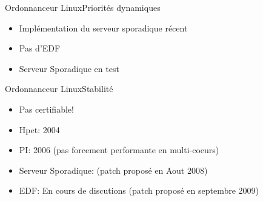 \begin{frame}{Ordonnanceur Linux}{Priorités dynamiques}
  \begin{itemize}
  \item Implémentation du serveur sporadique récent
  \item Pas d'EDF
  \item Serveur Sporadique en test
  \end{itemize}
\end{frame}

\begin{frame}{Ordonnanceur Linux}{Stabilité}
  \begin{itemize}
  \item Pas certifiable!
  \item Hpet: 2004
  \item PI: 2006 (pas forcement performante en multi-coeurs)
  \item Serveur Sporadique: (patch proposé en Aout 2008)
  \item EDF: En cours de discutions (patch proposé en septembre 2009)
  \end{itemize}
\end{frame}


